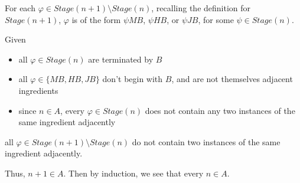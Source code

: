 \documentclass[a4paper]{article}
\newcommand{\SET}[1]{\{ {#1} \}}
\begin{document}
\begin{enumerate}
        For each $\varphi \in Stage(n + 1) \setminus Stage(n)$, recalling the definition for $Stage(n + 1)$, $\varphi$ is of the form $\psi MB$, $\psi HB$, or $\psi JB$, for some $\psi \in Stage(n)$.

        Given \begin{itemize}
            \item all $\varphi \in Stage(n)$ are terminated by $B$
            \item all $\varphi \in \SET{MB, HB, JB}$ don't begin with $B$, and are not themselves adjacent ingredients
            \item since $n \in A$, every $\varphi \in Stage(n)$ does not contain any two instances of the same ingredient adjacently
        \end{itemize}
        
        all $\varphi \in Stage(n + 1) \setminus Stage(n)$ do not contain two instances of the same ingredient adjacently. 

        Thus, $n + 1 \in A$. Then by induction, we see that every $n \in A$.


\end{enumerate}
\end{document}
